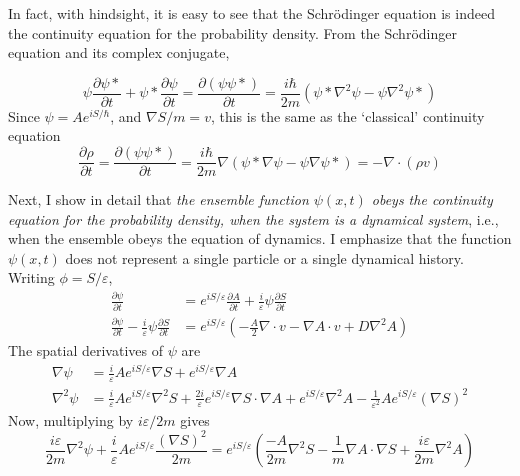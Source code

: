 In fact, with hindsight, it is easy to see that the Schr\"{o}dinger equation is indeed the
continuity equation for the probability density. From the Schr\"{o}dinger equation and its
complex conjugate,

\begin{equation*}
\psi\frac{\partial\psi*}{\partial t} + \psi*\frac{\partial\psi}{\partial t}=\frac{\partial(\psi\psi*)}{\partial t}=
\frac{i\hbar}{2m} \left(\psi*\nabla^2\psi-\psi\nabla^2\psi*\right)\tag{13}\label{c14-eq13}
\end{equation*}
Since $\psi=Ae^{iS/\hbar}$, and $\nabla S/m=v$, this is the same as the `classical' continuity equation
\begin{equation*}
\frac{\partial\rho}{\partial t} = \frac{\partial(\psi\psi*)}{\partial t}=\frac{i\hbar}{2m} \nabla (\psi*\nabla\psi-\psi\nabla\psi*) = -\nabla\cdot(\rho v)\tag{14}\label{c14-eq14}
\end{equation*}

Next, I show in detail that \textit{the ensemble function $\psi(x, t)$ obeys the continuity equation
for the probability density, when the system is a dynamical system}, i.e., when the ensemble
obeys the equation of dynamics. I emphasize that the function $\psi(x, t)$ does not represent a
single particle or a single dynamical history. Writing $\phi = S/\varepsilon$,
\begin{align}
\frac{\partial\psi}{\partial t} &= e^{iS/\varepsilon}\frac{\partial A}{\partial t} + \frac{i}{\varepsilon}\psi\frac{\partial S}{\partial t}\nonumber\\
\frac{\partial\psi}{\partial t}-\frac{i}{\varepsilon}\psi\frac{\partial S}{\partial t}&=e^{iS/\varepsilon}\left(-\frac{A}{2}\nabla\cdot v-\nabla A\cdot v+D\nabla^2A\right)\tag{15}\label{c14-eq15}
\end{align}
The spatial derivatives of $\psi$ are
\eject
\begin{align}
\nabla\psi &= \frac{i}{\varepsilon} Ae^{iS/\varepsilon}\nabla S + e^{iS/\varepsilon}\nabla A\nonumber\\
\nabla^2\psi &= \frac{i}{\varepsilon} Ae^{iS/\varepsilon}\nabla^2 S + \frac{2i}{\varepsilon}e^{iS/\varepsilon}\nabla S\cdot \nabla A + 
e^{iS/\varepsilon}\nabla^2 A - \frac{1}{\varepsilon^2} Ae^{iS/\varepsilon}(\nabla S)^2\tag{16}\label{c14-eq16}
\end{align}
Now, multiplying by $i\varepsilon /2m$ gives
\begin{equation*}
\frac{i\varepsilon}{2m} \nabla^2 \psi + \frac{i}{\varepsilon} A e^{iS/\varepsilon} \frac{(\nabla S)^2}{2m} = e^{iS/\varepsilon} \left(\frac{-A}{2m} \nabla^2 S - \frac{1}{m} \nabla A \cdot \nabla S + \frac{i\varepsilon}{2m} \nabla^2 A \right) \tag{17}\label{c14-eq17}
\end{equation*}

